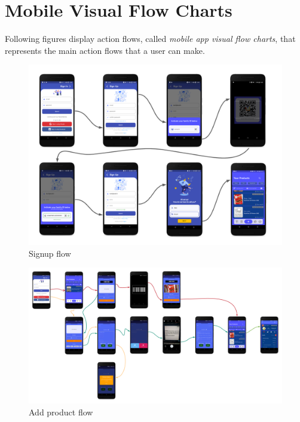 \newpage
\restoregeometry
\section{Mobile Visual Flow Charts}
Following figures display action flows, called \textit{mobile app visual flow charts}, that represents the main action flows that a user can make.





\begin{figure}[H]
   \centering
  \centerline{\includegraphics[width=160mm,scale=0.9]{./Images/flowdiagram/sign_up.png}}
  \caption{Signup flow}
\end{figure}



\begin{landscape}
\begin{figure}[h]
\vspace*{-2cm}
\noindent
\centering
\centerline{\includegraphics[scale = 0.65]{./Images/flowdiagram/add_product.png}}
\vspace*{-1cm}
    \caption{Add product flow}
    \vspace*{-12cm}
\end{figure}
\fillandplacepagenumber
\end{landscape}


